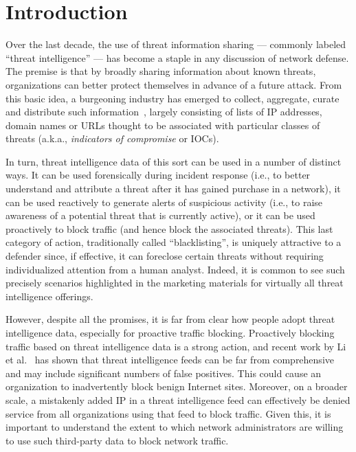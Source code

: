 \section{Introduction}
\label{sec:introduction}

Over the last decade, the use of threat information sharing ---
commonly labeled ``threat intelligence'' --- has become a staple
in any discussion of network defense.  The premise is that by broadly
sharing information about known threats, organizations can better
protect themselves in advance of a future attack.  From this basic
idea, a burgeoning industry has emerged to collect, aggregate, curate
and distribute such information~\cite{tipredict2018, tounsi2018survey},
largely consisting of lists of IP
addresses, domain names or URLs thought to be associated with
particular classes of threats (a.k.a., \textit{indicators of
  compromise} or IOCs).

In turn, threat intelligence data of this sort can be used in a number
of distinct ways.  It can be used forensically during incident response
(i.e., to better understand and attribute a threat after it has gained
purchase in a network), it can be used reactively to generate alerts
of suspicious activity (i.e., to raise awareness of a potential threat
that is currently active), or it can be used proactively to block
traffic (and hence block the associated threats).  This last category
of action, traditionally called ``blacklisting'', is uniquely
attractive to a defender since, if effective, it can foreclose certain
threats without requiring individualized attention from a human
analyst.  Indeed, it is common to see such precisely scenarios
highlighted in the marketing materials for virtually all threat
intelligence offerings.

However, despite all the promises, it is far from clear how people adopt
threat intelligence data, especially for proactive traffic blocking.
Proactively blocking traffic based on threat intelligence data is a strong
action, and recent work by Li et al.~\cite{li2019reading} has shown that
threat intelligence feeds can be far from comprehensive and may include
significant numbers of false positives. This could cause an organization
to inadvertently block benign Internet sites. Moreover, on a broader scale,
a mistakenly added IP in a threat intelligence feed can
effectively be denied service from all organizations using that feed
to block traffic. Given this, it is important to understand the extent
to which network administrators are willing to use such third-party data to
block network traffic.

